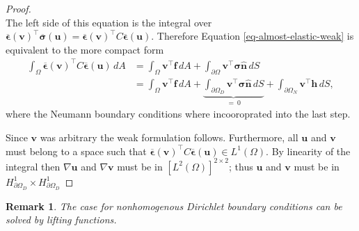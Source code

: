 \documentclass[5pt,a4paper,english]{elsarticle}%
\newtheorem*{remark}{Remark}
\begin{document}
\begin{proof}
\begin{equation}
\end{equation}
The left side of this equation is the integral over $\boldsymbol{\overline \epsilon}(\boldsymbol v)^\intercal \boldsymbol{\overline \sigma}(\boldsymbol u) = \boldsymbol{\overline \epsilon}(\boldsymbol v)^\intercal C\boldsymbol{\overline \epsilon}(\boldsymbol u)$. Therefore Equation \eqref{eq-almost-elastic-weak} is equivalent to the more compact form
\begin{align}
    \int_\Omega{ \boldsymbol{\overline \epsilon}(\boldsymbol v)^\intercal C\boldsymbol{\overline \epsilon}(\boldsymbol u)} \,dA  &=\int_\Omega{\boldsymbol{v}^\intercal \boldsymbol{f}} \,dA + \int_{\partial \Omega}{\boldsymbol{v}^\intercal \boldsymbol{\sigma}}\boldsymbol{\hat{n} } \,dS  \\
    &= \int_\Omega{\boldsymbol{v}^\intercal \boldsymbol{f}} \,dA + \underbrace{\int_{\partial \Omega_D}{\boldsymbol{v}^\intercal \boldsymbol{\sigma}}\boldsymbol{\hat{n} } \,dS}_{= \ 0} + \int_{\partial \Omega_N}{\boldsymbol{v}^\intercal \boldsymbol h} \,dS,
\end{align}
where the Neumann boundary conditions where incooroprated into the last step.

Since $\bm v$ was arbitrary the weak formulation follows. Furthermore, all $\bm u$ and $\bm v$ must belong to a space such that $\boldsymbol{\overline \epsilon}(\boldsymbol v)^\intercal C\boldsymbol{\overline \epsilon}(\boldsymbol u) \in {L^1}(\Omega)$. By linearity of the integral then $\nabla \bm u$ and $\nabla \bm v$ must be in $\left[{L^2}(\Omega)\right]^{2 \times 2}$; thus $\bm u$ and $\bm v$ must be in $ H^1_{\partial \Omega_D } \times H^1_{\partial \Omega_D } $
\end{proof}
\begin{remark}
    The case for nonhomogenous Dirichlet boundary conditions can be solved by lifting functions.
\end{remark}
\end{document}
